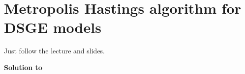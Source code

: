 \section[Metropolis Hastings algorithm for DSGE models]{Metropolis Hastings algorithm for DSGE models\label{ex:MetropolisHastingsDSGE}}
Just follow the lecture and slides.

\begin{solution}\textbf{Solution to }
\ifDisplaySolutions%

\fi
\newpage
\end{solution}